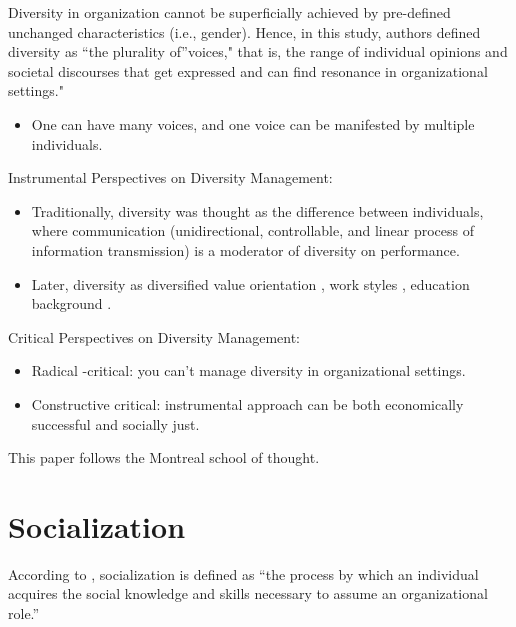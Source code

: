 \documentclass[
]{book}
\providecommand{\tightlist}{%
  \setlength{\itemsep}{0pt}\setlength{\parskip}{0pt}}
\begin{document}
\citep{Trittin_2015}

Diversity in organization cannot be superficially achieved by pre-defined unchanged characteristics (i.e., gender).
Hence, in this study, authors defined diversity as ``the plurality of''voices," that is, the range of individual opinions and societal discourses that get expressed and can find resonance in organizational settings."

\begin{itemize}
\tightlist
\item
  One can have many voices, and one voice can be manifested by multiple individuals.
\end{itemize}

Instrumental Perspectives on Diversity Management:

\begin{itemize}
\tightlist
\item
  Traditionally, diversity was thought as the difference between individuals, where communication (unidirectional, controllable, and linear process of information transmission) is a moderator of diversity on performance.
\item
  Later, diversity as diversified value orientation \citep{Eastman_2003}, work styles \citep{Shelton_2002}, education background \citep{Kearney_2009}.
\end{itemize}

Critical Perspectives on Diversity Management:

\begin{itemize}
\tightlist
\item
  Radical -critical: you can't manage diversity in organizational settings.
\item
  Constructive critical: instrumental approach can be both economically successful and socially just.
\end{itemize}

This paper follows the Montreal school of thought.

\hypertarget{socialization}{%
\chapter{Socialization}\label{socialization}}

\citep{Kramer_2011}

According to \citep{Van_Maanen_1979}, socialization is defined as ``the process by which an individual acquires the social knowledge and skills necessary to assume an organizational role.''
\end{document}
